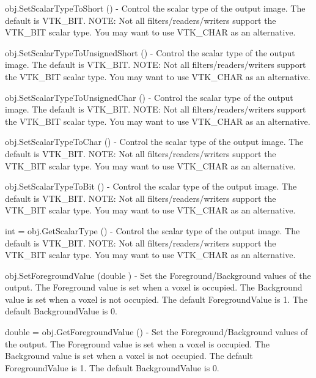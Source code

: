 \begin{DoxyItemize}
\item {\ttfamily obj.\-Set\-Scalar\-Type\-To\-Short ()} -\/ Control the scalar type of the output image. The default is V\-T\-K\-\_\-\-B\-I\-T. N\-O\-T\-E\-: Not all filters/readers/writers support the V\-T\-K\-\_\-\-B\-I\-T scalar type. You may want to use V\-T\-K\-\_\-\-C\-H\-A\-R as an alternative.  
\item {\ttfamily obj.\-Set\-Scalar\-Type\-To\-Unsigned\-Short ()} -\/ Control the scalar type of the output image. The default is V\-T\-K\-\_\-\-B\-I\-T. N\-O\-T\-E\-: Not all filters/readers/writers support the V\-T\-K\-\_\-\-B\-I\-T scalar type. You may want to use V\-T\-K\-\_\-\-C\-H\-A\-R as an alternative.  
\item {\ttfamily obj.\-Set\-Scalar\-Type\-To\-Unsigned\-Char ()} -\/ Control the scalar type of the output image. The default is V\-T\-K\-\_\-\-B\-I\-T. N\-O\-T\-E\-: Not all filters/readers/writers support the V\-T\-K\-\_\-\-B\-I\-T scalar type. You may want to use V\-T\-K\-\_\-\-C\-H\-A\-R as an alternative.  
\item {\ttfamily obj.\-Set\-Scalar\-Type\-To\-Char ()} -\/ Control the scalar type of the output image. The default is V\-T\-K\-\_\-\-B\-I\-T. N\-O\-T\-E\-: Not all filters/readers/writers support the V\-T\-K\-\_\-\-B\-I\-T scalar type. You may want to use V\-T\-K\-\_\-\-C\-H\-A\-R as an alternative.  
\item {\ttfamily obj.\-Set\-Scalar\-Type\-To\-Bit ()} -\/ Control the scalar type of the output image. The default is V\-T\-K\-\_\-\-B\-I\-T. N\-O\-T\-E\-: Not all filters/readers/writers support the V\-T\-K\-\_\-\-B\-I\-T scalar type. You may want to use V\-T\-K\-\_\-\-C\-H\-A\-R as an alternative.  
\item {\ttfamily int = obj.\-Get\-Scalar\-Type ()} -\/ Control the scalar type of the output image. The default is V\-T\-K\-\_\-\-B\-I\-T. N\-O\-T\-E\-: Not all filters/readers/writers support the V\-T\-K\-\_\-\-B\-I\-T scalar type. You may want to use V\-T\-K\-\_\-\-C\-H\-A\-R as an alternative.  
\item {\ttfamily obj.\-Set\-Foreground\-Value (double )} -\/ Set the Foreground/\-Background values of the output. The Foreground value is set when a voxel is occupied. The Background value is set when a voxel is not occupied. The default Foreground\-Value is 1. The default Background\-Value is 0.  
\item {\ttfamily double = obj.\-Get\-Foreground\-Value ()} -\/ Set the Foreground/\-Background values of the output. The Foreground value is set when a voxel is occupied. The Background value is set when a voxel is not occupied. The default Foreground\-Value is 1. The default Background\-Value is 0.  

\end{DoxyItemize}
